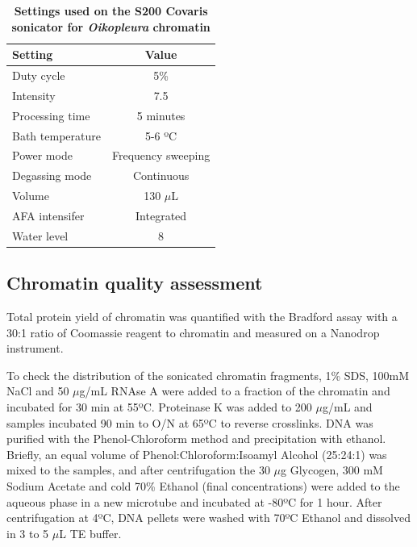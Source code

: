 \documentclass[11pt,twoside,a4paper]{report}
\begin{document}
			\begin{table}[!ht]
        		\caption{\bf{Settings used on the S200 Covaris sonicator for \textit{Oikopleura} chromatin}}
        		\begin{center}
	        		\begin{tabular}{l|c}
		           		\textbf{Setting} & \textbf{Value}\\
	        		    \hline
		        		Duty cycle& 5\%\\
	            	    Intensity & 7.5\\
						Processing time & 5 minutes\\
		        		Bath temperature & 5-6 ºC\\
						Power mode & Frequency sweeping\\
		        		Degassing mode & Continuous\\
		        		Volume & 130 $\mu$L\\
		        		AFA intensifer & Integrated\\
	        			Water level & 8\\
	        		\end{tabular}
    		    \end{center}
	        \label{table:CovarisSettings}
		    \end{table}
			
			\subsection{Chromatin quality assessment}
			\label{section:chromQualityAssess}
			Total protein yield of chromatin was quantified with the Bradford assay with a 30:1 ratio of Coomassie reagent to chromatin and measured on a Nanodrop instrument.
			
			To check the distribution of the sonicated chromatin fragments, 1\% SDS, 100mM NaCl and 50 $\mu$g/mL RNAse A were added to a fraction of the chromatin and incubated for 30 min at 55ºC. Proteinase K was added to 200 $\mu$g/mL and samples incubated 90 min to O/N at 65ºC to reverse crosslinks. DNA was purified with the Phenol-Chloroform method and precipitation with ethanol. Briefly, an equal volume of Phenol:Chloroform:Isoamyl Alcohol (25:24:1) was mixed to the samples, and after centrifugation the 30 $\mu$g Glycogen, 300 mM Sodium Acetate and cold 70\% Ethanol (final concentrations) were added to the aqueous phase in a new microtube and incubated at -80ºC for 1 hour. After centrifugation at 4ºC, DNA pellets were washed with 70ºC Ethanol and dissolved in 3 to 5 $\mu$L TE buffer. \\
			
\end{document}
